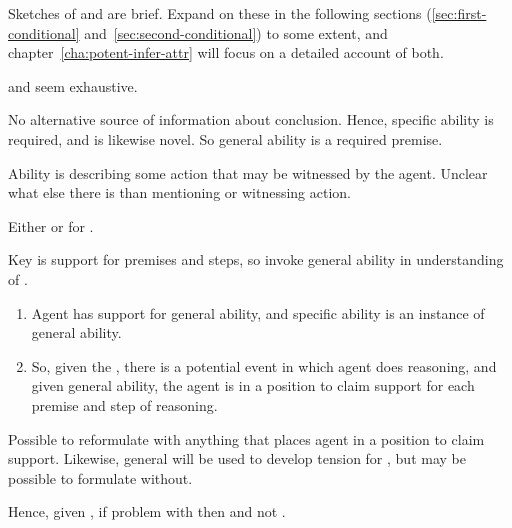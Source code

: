 \begin{note}
  Sketches of \AR{} and \WR{} are brief.
  Expand on these in the following sections (\ref{sec:first-conditional} and~\ref{sec:second-conditional}) to some extent, and chapter~\ref{cha:potent-infer-attr} will focus on a detailed account of both.
\end{note}

\begin{note}
  \begin{proposition}\label{prop:WR-and-AR-exhaustive}
    \AR{} and \WR{} seem exhaustive.
  \end{proposition}
  No alternative source of information about conclusion.
  Hence, specific ability is required, and is likewise novel.
  So general ability is a required premise.

  Ability is describing some action that may be witnessed by the agent.
  Unclear what else there is than mentioning or witnessing action.

  \begin{proposition}\label{either-AR-or-WR}
    Either \WR{} or \AR{} for \aben{}.
  \end{proposition}
\end{note}

\begin{note}[\WR{} alternative]
  Key is support for premises and steps, so invoke general ability in understanding of \WR{}.

  \begin{enumerate}
  \item Agent has support for general ability, and specific ability is an instance of general ability.
  \item So, given the \GSI{}, there is a potential event in which agent does reasoning, and given general ability, the agent is in a position to claim support for each premise and step of reasoning.
  \end{enumerate}

  Possible to reformulate with anything that places agent in a position to claim support.
  Likewise, general will be used to develop tension for \AR{}, but may be possible to formulate without.

  Hence, given \label{either-AR-or-WR}, if problem with \AR{} then \WR{} and not \uRa{}.
\end{note}

